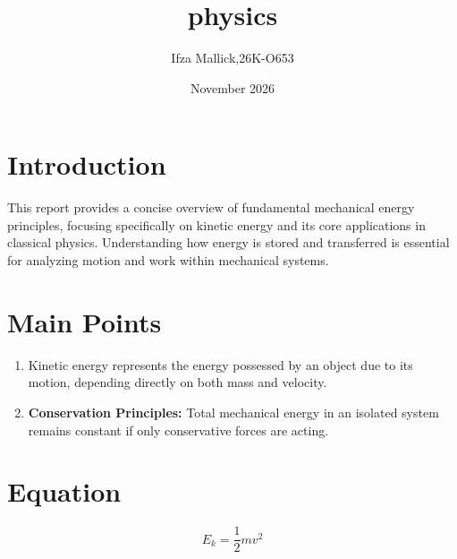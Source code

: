\documentclass{article}
\title{physics}
\author{Ifza Mallick,26K-O653 }
\date{November 2026}
\begin{document}
\maketitle

\section{Introduction}
This report provides a concise overview of fundamental mechanical energy principles, focusing specifically on kinetic energy and its core applications in classical physics. Understanding how energy is stored and transferred is essential for analyzing motion and work within mechanical systems.
\section{Main Points}
\begin{enumerate}
    \textbf{Definition of Energy:} Energy is the quantitative property that must be transferred to an object in order to perform work on, 
    or to heat, the object.
    \item  Kinetic energy represents the energy possessed by an object due to its motion, depending directly on both mass and velocity.
    \item  \textbf{Conservation Principles:} Total mechanical energy in an isolated system remains constant if only conservative forces are acting.
    
\end{enumerate}

\section{Equation}
\begin{equation}
    E_k = \frac{1}{2}mv^2
\end{equation}
\end{document}
